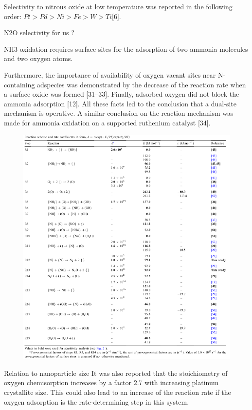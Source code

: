 Selectivity to nitrous oxide at low temperature was reported in the following order: $Pt > Pd > Ni > Fe > W > Ti $[6].

N2O selectivity for us ?

NH3 oxidation requires surface sites for the adsorption of two ammonia molecules and two oxygen atoms.

Furthermore, the importance of availability of oxygen vacant sites near N-containing adspecies was demonstrated by the decrease of the reaction rate when a surface oxide was formed [31–33].
Finally, adsorbed oxygen did not block the ammonia adsorption [12]. All these facts led to the conclusion that a dual-site mechanism is operative. A similar conclusion on the reaction mechanism was made for ammonia oxidation on a supported ruthenium catalyst [34].

\begin{figure}[ht]
    \centering
    \includegraphics[width=\textwidth]{Images/ReactionScheme.png}
    \caption{\cite{Rebrov2002}}
    \label{fig:my_label}
\end{figure}

Relation to nanoparticle size
It was also reported that the stoichiometry of oxygen chemisorption increases by a factor 2.7 with increasing platinum crystallite size. This could also lead to an increase of the reaction rate if the oxygen adsorption is the rate-determining step in this system.

